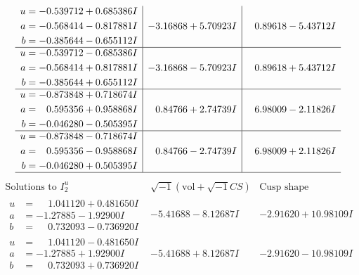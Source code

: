 \documentclass[1p]{elsarticle_modified}
\theoremstyle{definition}
\newcommand{\I}{\sqrt{-1}}
\begin{document}
$$\begin{array}{c|c|c}
\begin{aligned}
u &= -0.539712 + 0.685386 I \\
a &= -0.568414 - 0.817881 I \\
b &= -0.385644 - 0.655112 I\end{aligned}
 & -3.16868 + 5.70923 I & \phantom{-}0.89618 - 5.43712 I \\ \hline\begin{aligned}
u &= -0.539712 - 0.685386 I \\
a &= -0.568414 + 0.817881 I \\
b &= -0.385644 + 0.655112 I\end{aligned}
 & -3.16868 - 5.70923 I & \phantom{-}0.89618 + 5.43712 I \\ \hline\begin{aligned}
u &= -0.873848 + 0.718674 I \\
a &= \phantom{-}0.595356 + 0.958868 I \\
b &= -0.046280 - 0.505395 I\end{aligned}
 & \phantom{-}0.84766 + 2.74739 I & \phantom{-}6.98009 - 2.11826 I \\ \hline\begin{aligned}
u &= -0.873848 - 0.718674 I \\
a &= \phantom{-}0.595356 - 0.958868 I \\
b &= -0.046280 + 0.505395 I\end{aligned}
 & \phantom{-}0.84766 - 2.74739 I & \phantom{-}6.98009 + 2.11826 I\\
 \hline 
 \end{array}$$\newpage$$\begin{array}{c|c|c}  
\text{Solutions to }I^u_{2}& \I (\text{vol} + \sqrt{-1}CS) & \text{Cusp shape}\\
 \hline 
\begin{aligned}
u &= \phantom{-}1.041120 + 0.481650 I \\
a &= -1.27885 - 1.92900 I \\
b &= \phantom{-}0.732093 - 0.736920 I\end{aligned}
 & -5.41688 - 8.12687 I & -2.91620 + 10.98109 I \\ \hline\begin{aligned}
u &= \phantom{-}1.041120 - 0.481650 I \\
a &= -1.27885 + 1.92900 I \\
b &= \phantom{-}0.732093 + 0.736920 I\end{aligned}
 & -5.41688 + 8.12687 I & -2.91620 - 10.98109 I \\ \hline\begin{aligned}

\end{aligned}
\end{array}$$
\end{document}
